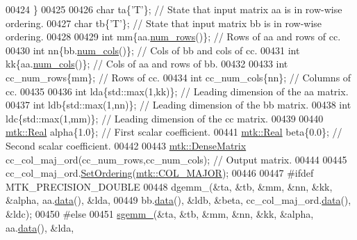 \begin{DoxyCode}
00424   \}
00425 
00426   \textcolor{keywordtype}{char} ta\{\textcolor{charliteral}{'T'}\}; \textcolor{comment}{// State that input matrix aa is in row-wise ordering.}
00427   \textcolor{keywordtype}{char} tb\{\textcolor{charliteral}{'T'}\}; \textcolor{comment}{// State that input matrix bb is in row-wise ordering.}
00428 
00429   \textcolor{keywordtype}{int} mm\{aa.\hyperlink{classmtk_1_1DenseMatrix_a53f3afb3b6a8d21854458aaa9663cc74}{num\_rows}()\};  \textcolor{comment}{// Rows of aa and rows of cc.}
00430   \textcolor{keywordtype}{int} nn\{bb.\hyperlink{classmtk_1_1DenseMatrix_a41747502d468c6728a4be31501b16e0e}{num\_cols}()\};  \textcolor{comment}{// Cols of bb and cols of cc.}
00431   \textcolor{keywordtype}{int} kk\{aa.\hyperlink{classmtk_1_1DenseMatrix_a41747502d468c6728a4be31501b16e0e}{num\_cols}()\};  \textcolor{comment}{// Cols of aa and rows of bb.}
00432 
00433   \textcolor{keywordtype}{int} cc\_num\_rows\{mm\};  \textcolor{comment}{// Rows of cc.}
00434   \textcolor{keywordtype}{int} cc\_num\_cols\{nn\};  \textcolor{comment}{// Columns of cc.}
00435 
00436   \textcolor{keywordtype}{int} lda\{std::max(1,kk)\};  \textcolor{comment}{// Leading dimension of the aa matrix.}
00437   \textcolor{keywordtype}{int} ldb\{std::max(1,nn)\};  \textcolor{comment}{// Leading dimension of the bb matrix.}
00438   \textcolor{keywordtype}{int} ldc\{std::max(1,mm)\};  \textcolor{comment}{// Leading dimension of the cc matrix.}
00439 
00440   \hyperlink{group__c01-roots_gac080bbbf5cbb5502c9f00405f894857d}{mtk::Real} alpha\{1.0\}; \textcolor{comment}{// First scalar coefficient.}
00441   \hyperlink{group__c01-roots_gac080bbbf5cbb5502c9f00405f894857d}{mtk::Real} beta\{0.0\};  \textcolor{comment}{// Second scalar coefficient.}
00442 
00443   \hyperlink{classmtk_1_1DenseMatrix}{mtk::DenseMatrix} cc\_col\_maj\_ord(cc\_num\_rows,cc\_num\_cols); \textcolor{comment}{// Output matrix.}
00444 
00445   cc\_col\_maj\_ord.\hyperlink{classmtk_1_1DenseMatrix_a178e63f365cf8c547dc5020c60357f5e}{SetOrdering}(\hyperlink{namespacemtk_ga622801bd9f912d0f976c3e383f5f581ca7c11989c132253fb76b8f6b1314f7e13}{mtk::COL\_MAJOR});
00446 
00447 \textcolor{preprocessor}{  #ifdef MTK\_PRECISION\_DOUBLE}
00448   dgemm\_(&ta, &tb, &mm, &nn, &kk, &alpha, aa.\hyperlink{classmtk_1_1DenseMatrix_a0c33b8a9e01d157c61ddbdf807c25d84}{data}(), &lda,
00449          bb.\hyperlink{classmtk_1_1DenseMatrix_a0c33b8a9e01d157c61ddbdf807c25d84}{data}(), &ldb, &beta, cc\_col\_maj\_ord.\hyperlink{classmtk_1_1DenseMatrix_a0c33b8a9e01d157c61ddbdf807c25d84}{data}(), &ldc);
00450 \textcolor{preprocessor}{  #else}
00451   \hyperlink{namespacemtk_adb7c0560326b8e57f255e58b87ec76b0}{sgemm\_}(&ta, &tb, &mm, &nn, &kk, &alpha, aa.\hyperlink{classmtk_1_1DenseMatrix_a0c33b8a9e01d157c61ddbdf807c25d84}{data}(), &lda,

\end{DoxyCode}
